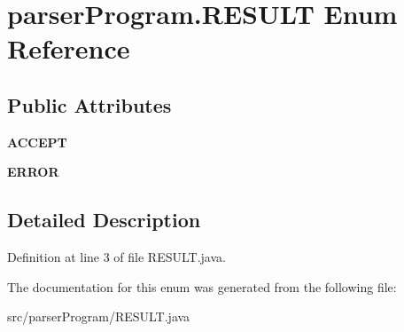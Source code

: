 \hypertarget{enumparser_program_1_1_r_e_s_u_l_t}{\section{parser\-Program.\-R\-E\-S\-U\-L\-T Enum Reference}
\label{enumparser_program_1_1_r_e_s_u_l_t}
}
\subsection*{Public Attributes}
\begin{DoxyCompactItemize}
\item 
\hypertarget{enumparser_program_1_1_r_e_s_u_l_t_a1e9fd6ad602e25983c6104f10c9bbf29}{{\bfseries A\-C\-C\-E\-P\-T}}\label{enumparser_program_1_1_r_e_s_u_l_t_a1e9fd6ad602e25983c6104f10c9bbf29}

\item 
\hypertarget{enumparser_program_1_1_r_e_s_u_l_t_ab53193d78e07c487ad5b3a77fc90de3a}{{\bfseries E\-R\-R\-O\-R}}\label{enumparser_program_1_1_r_e_s_u_l_t_ab53193d78e07c487ad5b3a77fc90de3a}

\end{DoxyCompactItemize}


\subsection{Detailed Description}


Definition at line 3 of file R\-E\-S\-U\-L\-T.\-java.



The documentation for this enum was generated from the following file\-:\begin{DoxyCompactItemize}
\item 
src/parser\-Program/R\-E\-S\-U\-L\-T.\-java\end{DoxyCompactItemize}
